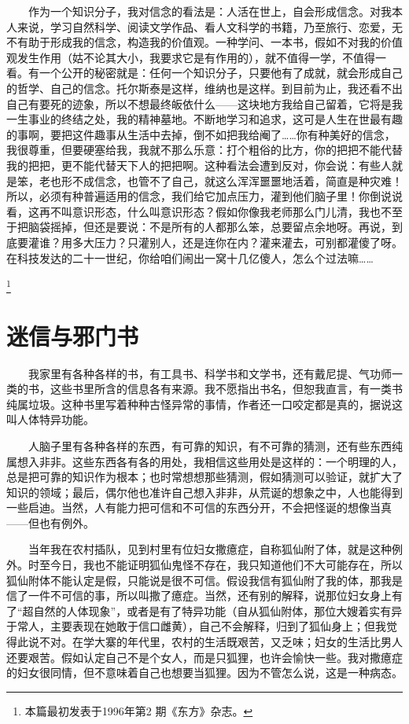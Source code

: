 　　作为一个知识分子，我对信念的看法是：人活在世上，自会形成信念。对我本人来说，学习自然科学、阅读文学作品、看人文科学的书籍，乃至旅行、恋爱，无不有助于形成我的信念，构造我的价值观。一种学问、一本书，假如不对我的价值观发生作用（姑不论其大小，我要求它是有作用的），就不值得一学，不值得一看。有一个公开的秘密就是：任何一个知识分子，只要他有了成就，就会形成自己的哲学、自己的信念。托尔斯泰是这样，维纳也是这样。到目前为止，我还看不出自己有要死的迹象，所以不想最终皈依什么——这块地方我给自己留着，它将是我一生事业的终结之处，我的精神墓地。不断地学习和追求，这可是人生在世最有趣的事啊，要把这件趣事从生活中去掉，倒不如把我给阉了……你有种美好的信念，我很尊重，但要硬塞给我，我就不那么乐意：打个粗俗的比方，你的把把不能代替我的把把，更不能代替天下人的把把啊。这种看法会遭到反对，你会说：有些人就是笨，老也形不成信念，也管不了自己，就这么浑浑噩噩地活着，简直是种灾难！所以，必须有种普遍适用的信念，我们给它加点压力，灌到他们脑子里！你倒说说看，这再不叫意识形态，什么叫意识形态？假如你像我老师那么门儿清，我也不至于把脑袋摇掉，但还是要说：不是所有的人都那么笨，总要留点余地呀。再说，到底要灌谁？用多大压力？只灌别人，还是连你在内？灌来灌去，可别都灌傻了呀。在科技发达的二十一世纪，你给咱们闹出一窝十几亿傻人，怎么个过法嘛…… 

\footnote{本篇最初发表于1996年第2 期《东方》杂志。}

\chapter{迷信与邪门书}

　　我家里有各种各样的书，有工具书、科学书和文学书，还有戴尼提、气功师一类的书，这些书里所含的信息各有来源。我不愿指出书名，但恕我直言，有一类书纯属垃圾。这种书里写着种种古怪异常的事情，作者还一口咬定都是真的，据说这叫人体特异功能。 

　　人脑子里有各种各样的东西，有可靠的知识，有不可靠的猜测，还有些东西纯属想入非非。这些东西各有各的用处，我相信这些用处是这样的：一个明理的人，总是把可靠的知识作为根本；也时常想想那些猜测，假如猜测可以验证，就扩大了知识的领域；最后，偶尔他也准许自己想入非非，从荒诞的想象之中，人也能得到一些启迪。当然，人有能力把可信和不可信的东西分开，不会把怪诞的想像当真——但也有例外。 

　　当年我在农村插队，见到村里有位妇女撒癔症，自称狐仙附了体，就是这种例外。时至今日，我也不能证明狐仙鬼怪不存在，我只知道他们不大可能存在，所以狐仙附体不能认定是假，只能说是很不可信。假设我信有狐仙附了我的体，那我是信了一件不可信的事，所以叫撒了癔症。当然，还有别的解释，说那位妇女身上有了“超自然的人体现象”，或者是有了特异功能（自从狐仙附体，那位大嫂着实有异于常人，主要表现在她敢于信口雌黄），自己不会解释，归到了狐仙身上；但我觉得此说不对。在学大寨的年代里，农村的生活既艰苦，又乏味；妇女的生活比男人还要艰苦。假如认定自己不是个女人，而是只狐狸，也许会愉快一些。我对撒癔症的妇女很同情，但不意味着自己也想要当狐狸。因为不管怎么说，这是一种病态。 


